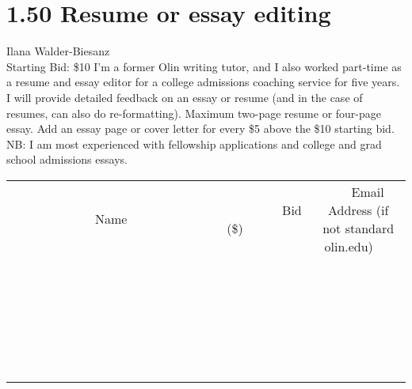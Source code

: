 \documentclass[11pt]{article}
\begin{document}
\section*{1.50 Resume or essay editing}
Ilana Walder-Biesanz
\\
Starting Bid: \$10
\newline
I'm a former Olin writing tutor, and I also worked part-time as a resume and essay editor for a college admissions coaching service for five years. I will provide detailed feedback on an essay or resume (and in the case of resumes, can also do re-formatting). Maximum two-page resume or four-page essay. Add an essay page or cover letter for every \$5 above the \$10 starting bid. NB: I am most experienced with fellowship applications and college and grad school admissions essays.
\\[6ex]
\begin{tabular}{c c c}
~~~~~~~~~~~~~Name~~~~~~~~~~~~~ & ~~~~~~~~~Bid (\$)~~~~~~~~~  & ~~~Email Address (if not standard olin.edu)~~~\\
 & & \\
\hline
 & & \\
\hline
 & & \\
\hline
 & & \\
\hline
 & & \\
\hline
 & & \\
\hline
 & & \\
\hline
 & & \\
\hline
 & & \\
\hline
 & & \\
\hline
 & & \\
\hline
 & & \\
\hline
 & & \\
\hline
 & & \\
\hline
 & & \\
\hline
 & & \\
\hline
 & & \\
\hline
 & & \\
\hline
 & & \\
\hline
 & & \\
\hline
 & & \\
\hline
 & & \\
\hline
 & & \\
\hline
 & & \\
\hline
 & & \\
\hline
 & & \\
\hline
\end{tabular}
\newpage
\end{document}
